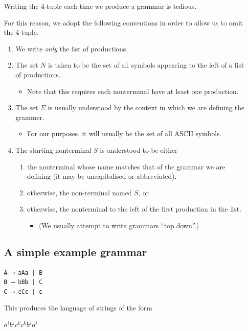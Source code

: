\documentclass[11pt]{article}
\theoremstyle{definition}
\begin{document}
Writing the 4-tuple each time we produce a grammar is tedious.

For this reason, we adopt the following conventions
in order to allow us to omit the 4-tuple.
\begin{enumerate}
\item We write \emph{only} the list of productions.
\item The set \(N\) is taken to be the set of all symbols
appearing to the left of a list of productions.
\begin{itemize}
\item Note that this requires each nonterminal have
at least one production.
\end{itemize}
\item The set \(Σ\) is usually understood by the context
in which we are defining the grammer.
\begin{itemize}
\item For our purposes, it will usually be the set of
all ASCII symbols.
\end{itemize}
\item The starting nonterminal \(S\) is understood to be either
\begin{enumerate}
\item the nonterminal whose name matches that of the grammar
we are defining (it may be uncapitalised or abbreviated),
\item otherwise, the non-terminal named \(S\), or
\item otherwise, the nonterminal to the left of
the first production in the list.
\begin{itemize}
\item (We usually attempt to write grammars “top down”.)
\end{itemize}
\end{enumerate}
\end{enumerate}

\subsection{A simple example grammar}
\label{sec:orgec7ea4f}

\begin{verbatim}
A ⟶ aAa | B
B ⟶ bBb | C
C ⟶ cCc | ε
\end{verbatim}

This produces the language of strings of
the form
\begin{center}
\(a^{i}b^{j}c^{k}c^{k}b^{j}a^{i}\)
\end{center}
\end{document}

